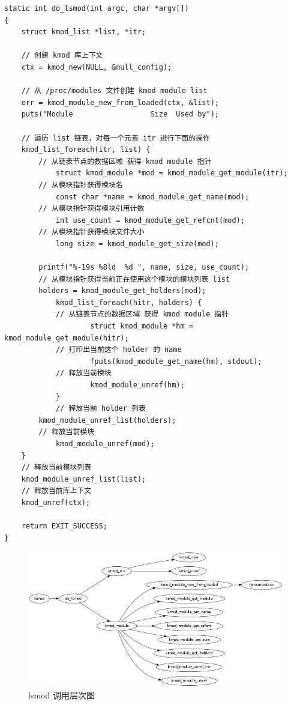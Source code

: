 {\begin{shaded}\begin{verbatim}
static int do_lsmod(int argc, char *argv[])
{
    struct kmod_list *list, *itr;

    // 创建 kmod 库上下文
    ctx = kmod_new(NULL, &null_config);

    // 从 /proc/modules 文件创建 kmod module list    
    err = kmod_module_new_from_loaded(ctx, &list);
    puts("Module                  Size  Used by");

    // 遍历 list 链表，对每一个元素 itr 进行下面的操作
    kmod_list_foreach(itr, list) {
        // 从链表节点的数据区域 获得 kmod module 指针
            struct kmod_module *mod = kmod_module_get_module(itr);
        // 从模块指针获得模块名
            const char *name = kmod_module_get_name(mod);
        // 从模块指针获得模块引用计数
            int use_count = kmod_module_get_refcnt(mod);
        // 从模块指针获得模块文件大小
            long size = kmod_module_get_size(mod);

        printf("%-19s %8ld  %d ", name, size, use_count);
        // 从模块指针获得当前正在使用这个模块的模块列表 list
        holders = kmod_module_get_holders(mod);
            kmod_list_foreach(hitr, holders) {
            // 从链表节点的数据区域 获得 kmod module 指针
                    struct kmod_module *hm = kmod_module_get_module(hitr);
            // 打印出当前这个 holder 的 name 
                    fputs(kmod_module_get_name(hm), stdout);
            // 释放当前模块
                    kmod_module_unref(hm);
            }
            // 释放当前 holder 列表
        kmod_module_unref_list(holders);
        // 释放当前模块
            kmod_module_unref(mod);
    }
    // 释放当前模块列表
    kmod_module_unref_list(list);
    // 释放当前库上下文
    kmod_unref(ctx);

    return EXIT_SUCCESS;
}
\end{verbatim}\end{shaded}}
\begin{figure}[htbp]
\centering
\includegraphics{./figures/lsmod.jpg}
\caption{lsmod 调用层次图}
\end{figure}

